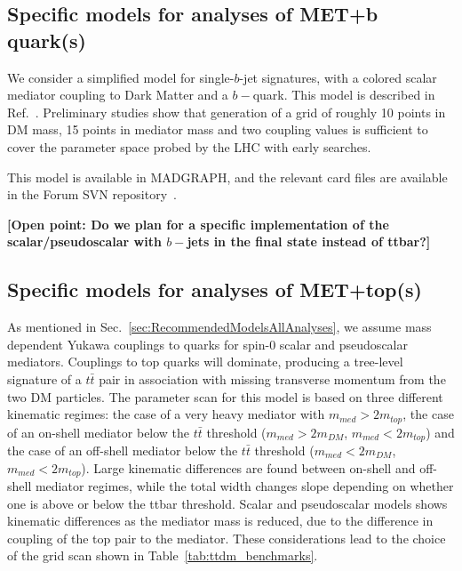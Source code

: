 \documentclass[a4,debug,notitlepage,nobib]{tufte-handout}
\begin{document}
\subsection{Specific models for analyses of MET+b quark(s)}


We consider a simplified model for single-$b$-jet signatures, 
with a colored scalar mediator coupling to Dark Matter and a $b-$quark. 
This model is described in Ref.~\cite{Agrawal:2014una}. Preliminary studies 
show that generation of a grid of roughly 10 points in DM mass, 15 points in mediator
mass and two coupling values is sufficient to cover the parameter
space probed by the LHC with early searches. 

This model is available in MADGRAPH, and the relevant card files are 
available in the Forum SVN repository~\cite{ForumSVN_DMSingleB}.


\textbf{[Open point: Do we plan for a specific implementation of the scalar/pseudoscalar
with $b-$jets in the final state instead of ttbar?]}

\subsection{Specific models for analyses of MET+top(s)}
\label{sub:SPttbar}


As mentioned in Sec.~\ref{sec:RecommendedModelsAllAnalyses}, we assume 
mass dependent Yukawa couplings to quarks for spin-$0$ scalar
and pseudoscalar mediators. Couplings to top quarks will dominate, 
producing a tree-level signature of a $t \bar{t}$ pair
in association with missing transverse momentum from the two DM particles.
The parameter scan for this model is based on three different kinematic
regimes: the case of a very heavy mediator with $m_{med} > 2 m_{top}$, 
the case of an on-shell mediator below the $t\bar{t}$ threshold ($m_{med} > 2 m_{DM}$, 
$m_{med} < 2 m_{top}$) and the case of an off-shell mediator below
the $t\bar{t}$ threshold ($m_{med} < 2 m_{DM}$, $m_{med} < 2 m_{top}$). 
Large kinematic differences are found between on-shell and off-shell mediator
regimes, while the total width changes slope depending on whether one
is above or below the ttbar threshold. 
Scalar and pseudoscalar models shows kinematic differences as the mediator mass 
is reduced, due to the difference in coupling of the top pair to the mediator. 
These considerations lead to the choice of the grid scan shown in 
Table~\ref{tab:ttdm_benchmarks}.
\end{document}

